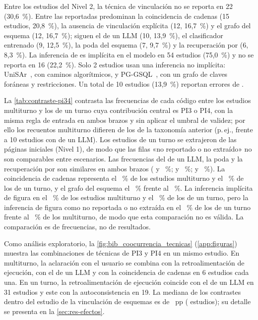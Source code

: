 Entre los \nUmbral{} estudios del Nivel 2, la técnica de vinculación no se reporta en 22 (30,6~\%). Entre las reportadas predominan la coincidencia de cadenas (15 estudios, 20,8~\%), la ausencia de vinculación explícita (12, 16,7~\%) y el grafo del esquema (12, 16,7~\%); siguen el  de un LLM (10, 13,9~\%), el clasificador entrenado (9, 12,5~\%), la poda del esquema (7, 9,7~\%) y la recuperación por  (6, 8,3~\%). La inferencia de  es implícita en el modelo en 54 estudios (75,0~\%) y no se reporta en 16 (22,2~\%). Solo 2 estudios usan una inferencia no implícita: UniSAr~\cite{Dou2023UniSAr}, con caminos algorítmicos, y PG-GSQL~\cite{Wang2020PGGSQL}, con un grafo de claves foráneas y restricciones. Un total de 10 estudios (13,9~\%) reportan errores de .



La \cref{tab:contraste-pi34} contrasta las frecuencias de cada código entre los \nCentralMT{} estudios multiturno y los \nCentralUT{} de un turno cuya contribución central es PI3 o PI4, con la misma regla de entrada en ambos brazos y sin aplicar el umbral de validez; por ello los recuentos multiturno difieren de los de la taxonomía anterior (p.\,ej., \nctLinkLlmPromptingMT{} frente a 10 estudios con  de un LLM). Los estudios de un turno se extrajeron de las páginas iniciales (Nivel 1), de modo que las filas «no reportado o no extraído» no son comparables entre escenarios. Las frecuencias del  de un LLM, la poda y la recuperación por  son similares en ambos brazos (\ctLinkLlmPromptingMT{} y \ctLinkLlmPromptingUT{}~\%; \ctLinkPodaEsquemaMT{} y \ctLinkPodaEsquemaUT{}~\%; \ctLinkEmbeddingsRecuperacionMT{} y \ctLinkEmbeddingsRecuperacionUT{}~\%). La coincidencia de cadenas representa el \ctLinkCoincidenciaCadenasMT{}~\% de los estudios multiturno y el \ctLinkCoincidenciaCadenasUT{}~\% de los de un turno, y el grafo del esquema el \ctLinkGrafoEsquemaMT{}~\% frente al \ctLinkGrafoEsquemaUT{}~\%. La inferencia implícita de  figura en el \ctJoinsImplicitaModeloMT{}~\% de los estudios multiturno y el \ctJoinsImplicitaModeloUT{}~\% de los de un turno, pero la inferencia de  figura como no reportada o no extraída en el \ctJoinsNrUT{}~\% de los de un turno frente al \ctJoinsNrMT{}~\% de los multiturno, de modo que esta comparación no es válida. La comparación es de frecuencias, no de resultados.

Como análisis exploratorio, la \cref{fig:bib_coocurrencia_tecnicas} (\cref{app:figuras}) muestra las combinaciones de técnicas de PI3 y PI4 en un mismo estudio. En multiturno, la aclaración con el usuario se combina con la retroalimentación de ejecución, con el  de un LLM y con la coincidencia de cadenas en 6 estudios cada una. En un turno, la retroalimentación de ejecución coincide con el  de un LLM en 31 estudios y este con la autoconsistencia en 19. La mediana de los contrastes dentro del estudio de la vinculación de esquemas es de \efVincMed{}~pp (\efVincN{} estudios); su detalle se presenta en la \cref{sec:res-efectos}.

